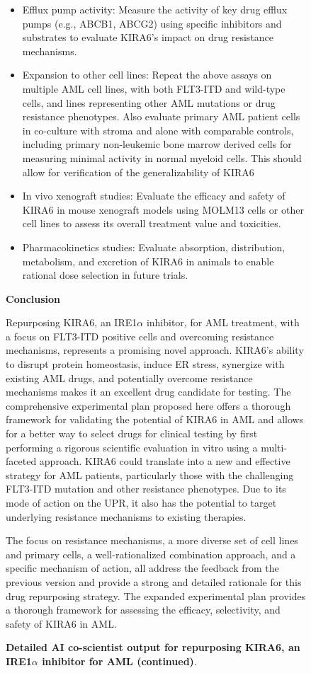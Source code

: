 \begin{figure}[htbp!]
\begin{tcolorbox}[
    colback=black!5!white,
    colframe=black!60!white,
    title=\textbf{KIRA6 for AML (continued)},
    fonttitle=\bfseries,
    arc=3mm,
    boxrule=1pt,
    bottomrule=2pt,
]
\begin{itemize}
    \item Efflux pump activity: Measure the activity of key drug efflux pumps (e.g., ABCB1, ABCG2) using specific inhibitors and substrates to evaluate KIRA6's impact on drug resistance mechanisms.
    \item Expansion to other cell lines: Repeat the above assays on multiple AML cell lines, with both FLT3-ITD and wild-type cells, and lines representing other AML mutations or drug resistance phenotypes. Also evaluate primary AML patient cells in co-culture with stroma and alone with comparable controls, including primary non-leukemic bone marrow derived cells for measuring minimal activity in normal myeloid cells. This should allow for verification of the generalizability of KIRA6
    \item In vivo xenograft studies: Evaluate the efficacy and safety of KIRA6 in mouse xenograft models using MOLM13 cells or other cell lines to assess its overall treatment value and toxicities.
    \item Pharmacokinetics studies: Evaluate absorption, distribution, metabolism, and excretion of KIRA6 in animals to enable rational dose selection in future trials.
\end{itemize}

\textbf{Conclusion}

Repurposing KIRA6, an IRE1$\alpha$ inhibitor, for AML treatment, with a focus on FLT3-ITD positive cells and overcoming resistance mechanisms, represents a promising novel approach. KIRA6's ability to disrupt protein homeostasis, induce ER stress, synergize with existing AML drugs, and potentially overcome resistance mechanisms makes it an excellent drug candidate for testing. The comprehensive experimental plan proposed here offers a thorough framework for validating the potential of KIRA6 in AML and allows for a better way to select drugs for clinical testing by first performing a rigorous scientific evaluation in vitro using a multi-faceted approach. KIRA6 could translate into a new and effective strategy for AML patients, particularly those with the challenging FLT3-ITD mutation and other resistance phenotypes. Due to its mode of action on the UPR, it also has the potential to target underlying resistance mechanisms to existing therapies.

The focus on resistance mechanisms, a more diverse set of cell lines and primary cells, a well-rationalized combination approach, and a specific mechanism of action, all address the feedback from the previous version and provide a strong and detailed rationale for this drug repurposing strategy. The expanded experimental plan provides a thorough framework for assessing the efficacy, selectivity, and safety of KIRA6 in AML.
\end{tcolorbox}
\vspace{0.1cm}
\caption{\textbf{Detailed AI co-scientist output for repurposing KIRA6, an IRE1$\alpha$ inhibitor for AML (continued)}.}
\label{fig:ex_kira6_5}
\end{figure}


